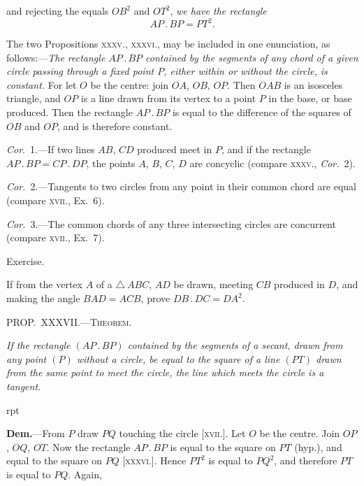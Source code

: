 \documentclass[oneside]{book}
\newcounter{wrapwidth}
\newcommand\mypropl[2]{
\bigskip\Needspace*{4\baselineskip}\begin{center}\textsc{#1}\end{center}
\hspace{\parindent}\emph{#2}\par\medskip
}
\newcommand\exhead[1]{
\Needspace*{5\baselineskip}\begin{center}
\textsf{#1}
\end{center}
}
\newcommand\imgflow[3]{
\setcounter{wrapwidth}{#1}

\begin{wrapfigure}[#2]{r}{\value{wrapwidth}pt}
\begin{center}
\vspace{-0.3in}

\end{center}
\end{wrapfigure}
}
\begin{document}
\noindent and rejecting the equals $OB^2$ and $OT^2$, \emph{we have the
rectangle}
\[
AP\,.\,BP = PT^2.
\]

\begin{footnotesize}
The two Propositions \textsc{xxxv., xxxvi.}, may be included in one
enunciation, as follows:---\emph{The rectangle $AP\,.\,BP$ contained by the
segments of any chord of a given circle passing through a fixed point
$P$, either within or without the circle, is constant.} For let $O$ be
the centre: join $OA$, $OB$, $OP$. Then $OAB$ is an isosceles triangle,
and $OP$ is a line drawn from its vertex to a point $P$ in the base,
or base produced. Then the rectangle $AP\,.\,BP$ is equal to the
difference of the squares of $OB$ and $OP$, and is therefore constant.
\par\end{footnotesize}

\emph{Cor}.~1.---If two lines $AB$, $CD$ produced meet in $P$,
and if the rectangle $AP\,.\,BP = CP\,.\,DP$, the points
$A$, $B$, $C$, $D$ are concyclic\label{concylic3} (compare \textsc{xxxv}., \emph{Cor.}~2).

\emph{Cor.}~2.---Tangents to two circles from any point in
their common chord are equal (compare \textsc{xvii}., Ex.~6).

\emph{Cor.}~3.---The common chords of any three intersecting
circles are concurrent (compare \textsc{xvii.}, Ex.~7).

\exhead{Exercise.}

\begin{footnotesize}
If from the vertex $A$ of a $\triangle\ ABC$, $AD$ be drawn, meeting
$CB$ produced in $D$, and making the angle $BAD = ACB$, prove
$DB\,.\,DC = DA^2$.
\par\end{footnotesize}

\mypropl{PROP\@.~XXXVII\@.---Theorem.}{If the rectangle $(AP\,.\,BP)$ contained by the segments of
a secant, drawn from any point $(P)$ without a circle, be
equal to the square of a line $(PT)$ drawn from the same
point to meet the circle, the line which meets the circle is
a tangent.}


\imgflow{175}{10}{f150}

\textbf{Dem.}---From $P$ draw $PQ$ touching the circle [\textsc{xvii.}].
Let $O$ be the centre.
Join $OP$, $OQ$, $OT$.
Now the rectangle
$AP\,.\,BP$ is equal to the
square on $PT$ (hyp.),
and equal to the square
on $PQ$ [\textsc{xxxvi.}]. Hence
$PT^2$ is equal to $PQ^2$,
and therefore $PT$ is
equal to $PQ$. Again,
\end{document}
